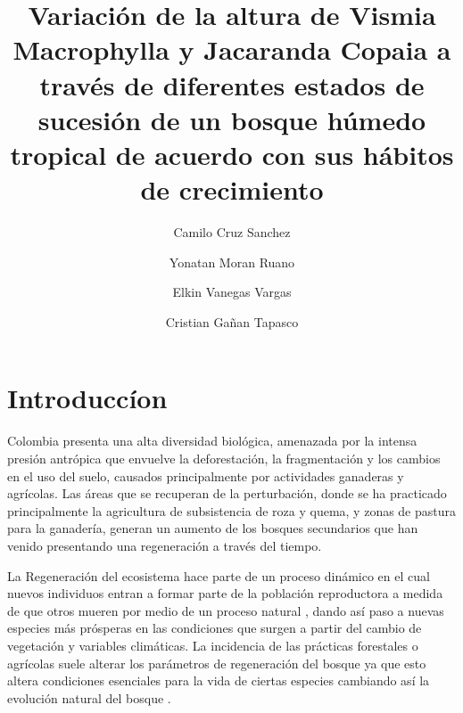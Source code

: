 \documentclass[letterpaper,9pt,onecolumn,twoside,]{pinp}
\title{Variación de la altura de Vismia Macrophylla y Jacaranda Copaia a través
de diferentes estados de sucesión de un bosque húmedo tropical de
acuerdo con sus hábitos de crecimiento}
\author[a]{Camilo Cruz Sanchez}
\author[a]{Yonatan Moran Ruano}
\author[a]{Elkin Vanegas Vargas}
\author[a]{Cristian Gañan Tapasco}
\affil[a]{Departamento de ciencias forestales, Univeridad Nacional de Colombia,
Medellín}
\begin{document}
\verticaladjustment{-2pt}

\maketitle
\thispagestyle{firststyle}



\hypertarget{introduccuxedon}{%
\section{Introduccíon}\label{introduccuxedon}}

Colombia presenta una alta diversidad biológica, amenazada por la
intensa presión antrópica que envuelve la deforestación, la
fragmentación y los cambios en el uso del suelo, causados principalmente
por actividades ganaderas y agrícolas.\citep{salas} Las áreas que se
recuperan de la perturbación, donde se ha practicado principalmente la
agricultura de subsistencia de roza y quema, y zonas de pastura para la
ganadería, generan un aumento de los bosques secundarios\citep{hammer}
que han venido presentando una regeneración a través del tiempo.

La Regeneración del ecosistema hace parte de un proceso dinámico en el
cual nuevos individuos entran a formar parte de la población reproductora
a medida de que otros mueren por medio de un proceso natural
\citep{pulido}, dando así paso a nuevas especies más prósperas en las
condiciones que surgen a partir del cambio de vegetación y variables
climáticas. La incidencia de las prácticas forestales o agrícolas suele
alterar los parámetros de regeneración del bosque ya que esto altera
condiciones esenciales para la vida de ciertas especies cambiando así la
evolución natural del bosque \citep{pulido}.
\end{document}
